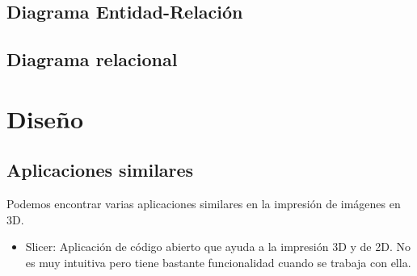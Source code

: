\documentclass[a4paper,11pt, twoside]{article}
\begin{document}
\subsection{Diagrama Entidad-Relación}
\begin{figure}[h]
                \centering
            \end{figure} 
            
\subsection{Diagrama relacional}
\begin{figure}[h]
                \centering
            \end{figure} 
            
\section{Diseño}
\subsection{Aplicaciones similares}
Podemos encontrar varias aplicaciones similares en la impresión de imágenes en 3D.
\vspace{-2.5mm}
\begin{itemize}[noitemsep,topsep=0pt]
\item Slicer: Aplicación de código abierto que ayuda a la impresión 3D y de 2D. No es muy intuitiva pero tiene bastante funcionalidad cuando se trabaja con ella.
\end{itemize}
\end{document}

